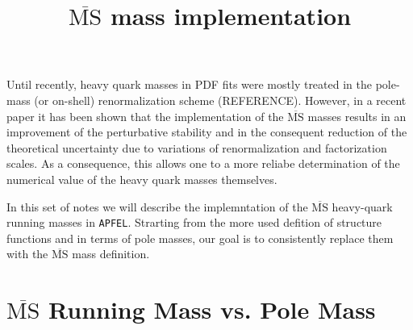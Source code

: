 \documentclass[10pt,a4paper]{article}
\begin{document}
%
%
\tableofcontents

\newpage

\title{$\overline{\mbox{MS}}$ mass implementation}

Until recently, heavy quark masses in PDF fits were mostly treated in
the pole-mass (or on-shell) renormalization scheme
(REFERENCE). However, in a recent paper \cite{Alekhin:2010sv} it has
been shown that the implementation of the $\overline{\mbox{MS}}$
masses results in an improvement of the perturbative stability and in
the consequent reduction of the theoretical uncertainty due to
variations of renormalization and factorization scales.  As a
consequence, this allows one to a more reliabe determination of the
numerical value of the heavy quark masses themselves.

In this set of notes we will describe the implemntation of the
$\overline{\mbox{MS}}$ heavy-quark running masses in {\tt APFEL}.
Strarting from the more used defition of structure functions and in
terms of pole masses, our goal is to consistently replace them with
the $\overline{\mbox{MS}}$ mass definition.

\section{$\overline{\mbox{MS}}$ Running Mass vs. Pole Mass}
\end{document}
